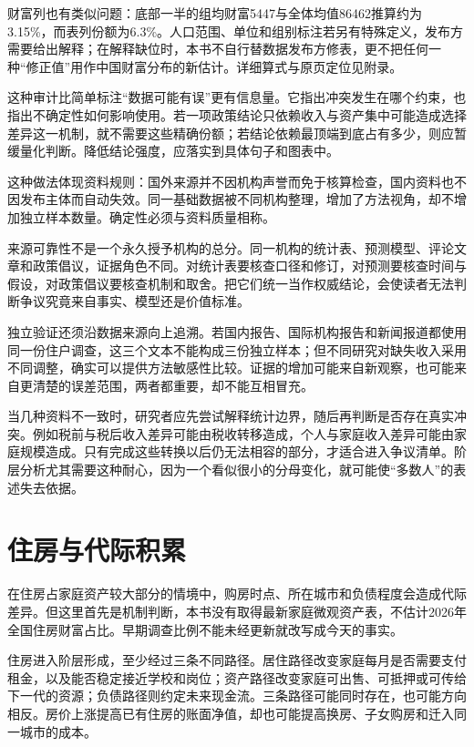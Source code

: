 \documentclass[UTF8,fontset=fandol,zihao=-4,oneside,openany]{ctexbook}
\begin{document}
财富列也有类似问题：底部一半的组均财富5447与全体均值86462推算约为3.15\%，而表列份额为6.3\%。人口范围、单位和组别标注若另有特殊定义，发布方需要给出解释；在解释缺位时，本书不自行替数据发布方修表，更不把任何一种“修正值”用作中国财富分布的新估计。详细算式与原页定位见附录。

这种审计比简单标注“数据可能有误”更有信息量。它指出冲突发生在哪个约束，也指出不确定性如何影响使用。若一项政策结论只依赖收入与资产集中可能造成选择差异这一机制，就不需要这些精确份额；若结论依赖最顶端到底占有多少，则应暂缓量化判断。降低结论强度，应落实到具体句子和图表中。

这种做法体现资料规则：国外来源并不因机构声誉而免于核算检查，国内资料也不因发布主体而自动失效。同一基础数据被不同机构整理，增加了方法视角，却不增加独立样本数量。确定性必须与资料质量相称。

\label{arg:P166}
来源可靠性不是一个永久授予机构的总分。同一机构的统计表、预测模型、评论文章和政策倡议，证据角色不同。对统计表要核查口径和修订，对预测要核查时间与假设，对政策倡议要核查机制和取舍。把它们统一当作权威结论，会使读者无法判断争议究竟来自事实、模型还是价值标准。

独立验证还须沿数据来源向上追溯。若国内报告、国际机构报告和新闻报道都使用同一份住户调查，这三个文本不能构成三份独立样本；但不同研究对缺失收入采用不同调整，确实可以提供方法敏感性比较。证据的增加可能来自新观察，也可能来自更清楚的误差范围，两者都重要，却不能互相冒充。

当几种资料不一致时，研究者应先尝试解释统计边界，随后再判断是否存在真实冲突。例如税前与税后收入差异可能由税收转移造成，个人与家庭收入差异可能由家庭规模造成。只有完成这些转换以后仍无法相容的部分，才适合进入争议清单。阶层分析尤其需要这种耐心，因为一个看似很小的分母变化，就可能使“多数人”的表述失去依据。

\section{住房与代际积累}
在住房占家庭资产较大部分的情境中，购房时点、所在城市和负债程度会造成代际差异。但这里首先是机制判断，本书没有取得最新家庭微观资产表，不估计2026年全国住房财富占比。早期调查比例不能未经更新就改写成今天的事实。

\label{arg:P167}
住房进入阶层形成，至少经过三条不同路径。居住路径改变家庭每月是否需要支付租金，以及能否稳定接近学校和岗位；资产路径改变家庭可出售、可抵押或可传给下一代的资源；负债路径则约定未来现金流。三条路径可能同时存在，也可能方向相反。房价上涨提高已有住房的账面净值，却也可能提高换房、子女购房和迁入同一城市的成本。
\end{document}
